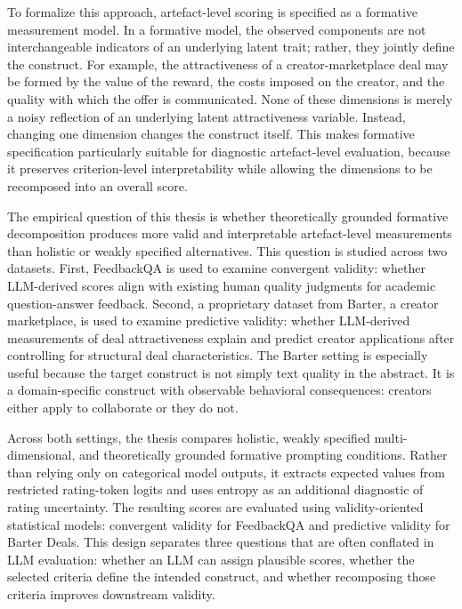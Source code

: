 To formalize this approach, artefact-level scoring is specified as a formative measurement model. In a formative model, the observed components are not interchangeable indicators of an underlying latent trait; rather, they jointly define the construct. For example, the attractiveness of a creator-marketplace deal may be formed by the value of the reward, the costs imposed on the creator, and the quality with which the offer is communicated. None of these dimensions is merely a noisy reflection of an underlying latent attractiveness variable. Instead, changing one dimension changes the construct itself. This makes formative specification particularly suitable for diagnostic artefact-level evaluation, because it preserves criterion-level interpretability while allowing the dimensions to be recomposed into an overall score.

The empirical question of this thesis is whether theoretically grounded formative decomposition produces more valid and interpretable artefact-level measurements than holistic or weakly specified alternatives. This question is studied across two datasets. First, FeedbackQA is used to examine convergent validity: whether LLM-derived scores align with existing human quality judgments for academic question-answer feedback. Second, a proprietary dataset from Barter, a creator marketplace, is used to examine predictive validity: whether LLM-derived measurements of deal attractiveness explain and predict creator applications after controlling for structural deal characteristics. The Barter setting is especially useful because the target construct is not simply text quality in the abstract. It is a domain-specific construct with observable behavioral consequences: creators either apply to collaborate or they do not.

Across both settings, the thesis compares holistic, weakly specified multi-dimensional, and theoretically grounded formative prompting conditions. Rather than relying only on categorical model outputs, it extracts expected values from restricted rating-token logits and uses entropy as an additional diagnostic of rating uncertainty. The resulting scores are evaluated using validity-oriented statistical models: convergent validity for FeedbackQA and predictive validity for Barter Deals. This design separates three questions that are often conflated in LLM evaluation: whether an LLM can assign plausible scores, whether the selected criteria define the intended construct, and whether recomposing those criteria improves downstream validity.

